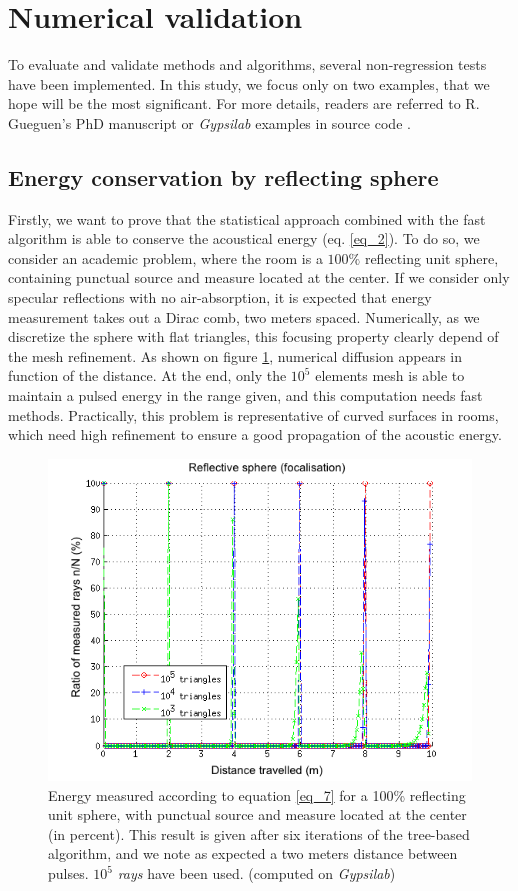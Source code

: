 \documentclass[AMA,STIX1COL]{WileyNJD-v2}
\begin{document}
\section{Numerical validation}
To evaluate and validate methods and algorithms, several non-regression tests have been implemented. In this study, we focus only on two examples, that we hope will be the most significant. For more details, readers are referred to R. Gueguen's PhD manuscript \cite{theseRobin} or \textit{Gypsilab} examples in source code \cite{githubGypsi}.   

\subsection{Energy conservation by reflecting sphere}
Firstly, we want to prove that the statistical approach combined with the fast algorithm is able to conserve the acoustical energy (eq. \ref{eq_2}). To do so, we consider an academic problem, where the room is a $100\%$ reflecting unit sphere, containing punctual source and measure located at the center. If we consider only specular reflections with no air-absorption, it is expected that energy measurement takes out a Dirac comb, two meters spaced.
Numerically, as we discretize the sphere with flat triangles, this focusing property clearly depend of the mesh refinement. As shown on figure \ref{test2RIR}, numerical diffusion appears in function of the distance.  At the end, only the $10^5$ elements mesh is able to maintain a pulsed energy in the range given, and this computation needs fast methods. Practically, this problem is representative of curved surfaces in rooms, which need high refinement to ensure a good propagation of the acoustic energy.

\begin{figure}[t]
\centering
		\includegraphics[width=0.6\linewidth]{sphere}
		\caption{Energy measured according to equation \ref{eq_7} for a 100\% reflecting unit sphere, with punctual source and measure located at the center (in percent). This result is given after six iterations of the tree-based algorithm, and we note as expected a two meters distance between pulses. $10^5$ \textit{rays} have been used. (computed on \textit{Gypsilab})}
		\label{test2RIR}
\end{figure}
\end{document}
